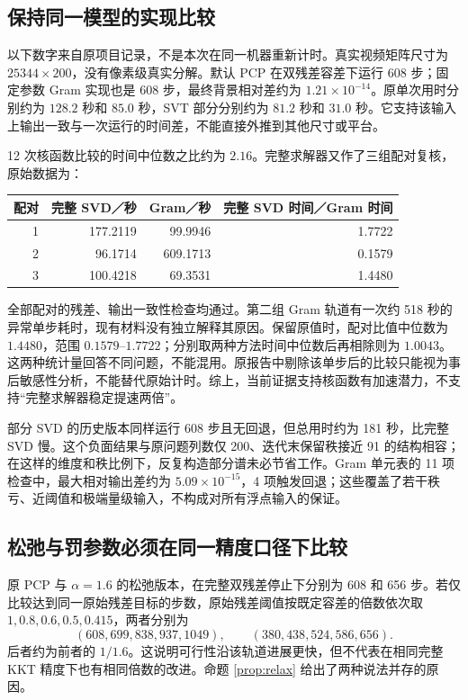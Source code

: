 \documentclass[UTF8,fontset=none,zihao=-4,a4paper]{ctexart}
\theoremstyle{plainzh}
\numberwithin{equation}{section}
\begin{document}
\subsection{保持同一模型的实现比较}
以下数字来自原项目记录，不是本次在同一机器重新计时。真实视频矩阵尺寸为 $25344\times200$，没有像素级真实分解。默认 PCP 在双残差容差下运行 608 步；固定参数 Gram 实现也是 608 步，最终背景相对差约为 $1.21\times10^{-14}$。原单次用时分别约为 $128.2$ 秒和 $85.0$ 秒，SVT 部分分别约为 $81.2$ 秒和 $31.0$ 秒。它支持该输入上输出一致与一次运行的时间差，不能直接外推到其他尺寸或平台。

12 次核函数比较的时间中位数之比约为 $2.16$。完整求解器又作了三组配对复核，原始数据为：
\begin{center}
\begin{tabular}{rrrr}
\toprule
配对 & 完整 SVD／秒 & Gram／秒 & 完整 SVD 时间／Gram 时间\\
\midrule
1 &177.2119&99.9946&1.7722\\
2 &96.1714&609.1713&0.1579\\
3 &100.4218&69.3531&1.4480\\
\bottomrule
\end{tabular}
\end{center}
全部配对的残差、输出一致性检查均通过。第二组 Gram 轨道有一次约 518 秒的异常单步耗时，现有材料没有独立解释其原因。保留原值时，配对比值中位数为 $1.4480$，范围 $0.1579$--$1.7722$；分别取两种方法时间中位数后再相除则为 $1.0043$。这两种统计量回答不同问题，不能混用。原报告中剔除该单步后的比较只能视为事后敏感性分析，不能替代原始计时。综上，当前证据支持核函数有加速潜力，不支持“完整求解器稳定提速两倍”。

部分 SVD 的历史版本同样运行 608 步且无回退，但总用时约为 181 秒，比完整 SVD 慢。这个负面结果与原问题列数仅 200、迭代末保留秩接近 91 的结构相容；在这样的维度和秩比例下，反复构造部分谱未必节省工作。Gram 单元表的 11 项检查中，最大相对输出差约为 $5.09\times10^{-15}$，4 项触发回退；这些覆盖了若干秩亏、近阈值和极端量级输入，不构成对所有浮点输入的保证。

\subsection{松弛与罚参数必须在同一精度口径下比较}
原 PCP 与 $\alpha=1.6$ 的松弛版本，在完整双残差停止下分别为 608 和 656 步。若仅比较达到同一原始残差目标的步数，原始残差阈值按既定容差的倍数依次取 $1,0.8,0.6,0.5,0.415$，两者分别为
\begin{equation*}
 (608,699,838,937,1049),\qquad(380,438,524,586,656).
\end{equation*}
后者约为前者的 $1/1.6$。这说明可行性沿该轨道进展更快，但不代表在相同完整 KKT 精度下也有相同倍数的改进。命题 \ref{prop:relax} 给出了两种说法并存的原因。
\end{document}
